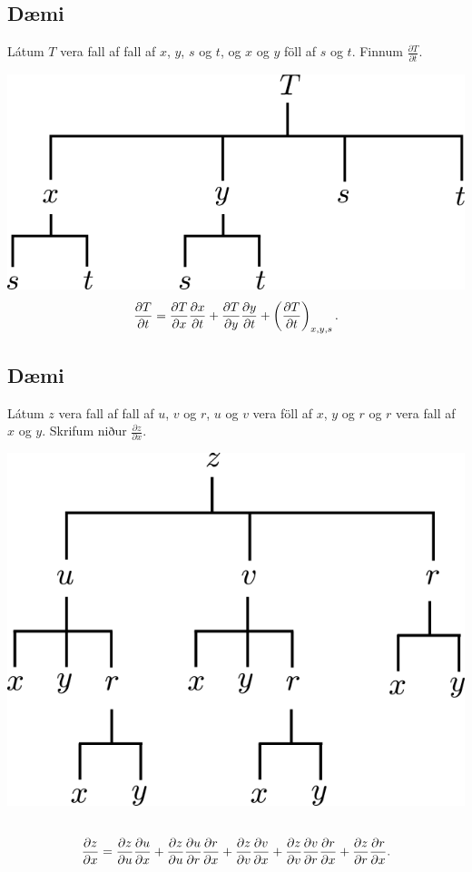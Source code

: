 \documentclass[a4paper,10pt,icelandic]{sphinxmanual}
\begin{document}
\subsection{Dæmi}
\label{Kafli2:id22}
Látum \(T\) vera fall af fall af \(x\), \(y\), \(s\) og
\(t\), og \(x\) og \(y\) föll af \(s\) og \(t\).
Finnum \(\frac{ \partial T}{\partial t}\).

{\hfill\includegraphics[width=0.500\linewidth]{chain6.png}\hfill}
\begin{gather}
\begin{split}\displaystyle \frac{\partial T}{\partial t} = \frac{\partial T}{\partial x} \frac{\partial x}{\partial t} +\frac{\partial T}{\partial y} \frac{\partial y}{\partial t} + \left(\frac{\partial T}{\partial t}\right)_{x,y,s} .\end{split}\notag
\end{gather}

\subsection{Dæmi}
\label{Kafli2:id23}
Látum \(z\) vera fall af fall af \(u\), \(v\) og \(r\),
\(u\) og \(v\) vera föll af \(x\), \(y\) og \(r\) og
\(r\) vera fall af \(x\) og \(y\). Skrifum niður
\(\frac{\partial z}{\partial x}\).

{\hfill\includegraphics[width=0.400\linewidth]{chain4.png}\hfill}
\begin{gather}
\begin{split}\displaystyle\end{split}\notag\\\begin{split}\displaystyle\frac{\partial z}{\partial x} = \frac{\partial z}{\partial u} \frac{\partial u}{\partial x} +\frac{\partial z}{\partial u} \frac{\partial u}{\partial r} \frac{\partial r}{\partial x}
+ \frac{\partial z}{\partial v} \frac{\partial v}{\partial x} + \frac{\partial z}{\partial v} \frac{\partial v}{\partial r} \frac{\partial r}{\partial x} +\frac{\partial z}{\partial r} \frac{\partial r}{\partial x}.\end{split}\notag
\end{gather}
\end{document}
